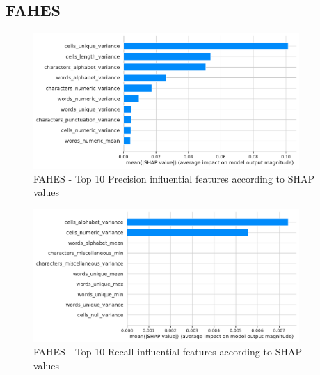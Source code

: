 \subsection{FAHES}
\begin{figure}[H]
    \centering
    \includegraphics[width=0.9\textwidth]{thesis/Figures/RQ4/Shap_cell_prec_FAHES.pdf}
    \caption{FAHES - Top 10 Precision influential features according to SHAP values}
    \label{fig:feature_importance_prec_FAHES}
\end{figure}
\begin{figure}[H]
    \centering
    \includegraphics[width=0.9\textwidth]{thesis/Figures/RQ4/Shap_cell_rec_FAHES.pdf}
    \caption{FAHES - Top 10 Recall influential features according to SHAP values}
    \label{fig:feature_importance_rec_FAHES}
\end{figure}


